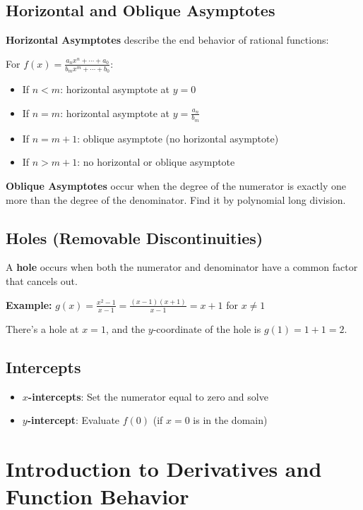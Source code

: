 \documentclass[12pt]{article}
\begin{document}
\subsection{Horizontal and Oblique Asymptotes}

\textbf{Horizontal Asymptotes} describe the end behavior of rational functions:

For $f(x) = \frac{a_n x^n + \cdots + a_0}{b_m x^m + \cdots + b_0}$:
\begin{itemize}
\item If $n < m$: horizontal asymptote at $y = 0$
\item If $n = m$: horizontal asymptote at $y = \frac{a_n}{b_m}$
\item If $n = m + 1$: oblique asymptote (no horizontal asymptote)
\item If $n > m + 1$: no horizontal or oblique asymptote
\end{itemize}

\textbf{Oblique Asymptotes} occur when the degree of the numerator is exactly one more than the degree of the denominator. Find it by polynomial long division.

\subsection{Holes (Removable Discontinuities)}

A \textbf{hole} occurs when both the numerator and denominator have a common factor that cancels out.

\textbf{Example:} $g(x) = \frac{x^2 - 1}{x - 1} = \frac{(x-1)(x+1)}{x-1} = x + 1$ for $x \neq 1$

There's a hole at $x = 1$, and the $y$-coordinate of the hole is $g(1) = 1 + 1 = 2$.

\subsection{Intercepts}

\begin{itemize}
\item \textbf{$x$-intercepts}: Set the numerator equal to zero and solve
\item \textbf{$y$-intercept}: Evaluate $f(0)$ (if $x = 0$ is in the domain)
\end{itemize}

\section{Introduction to Derivatives and Function Behavior}
\end{document}
